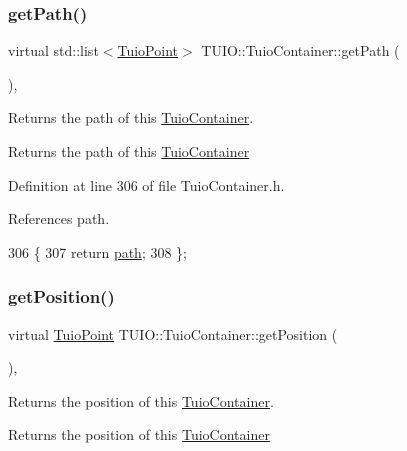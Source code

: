 \subsubsection{\texorpdfstring{get\+Path()}{getPath()}}
{\footnotesize\ttfamily virtual std\+::list$<$\hyperlink{class_t_u_i_o_1_1_tuio_point}{Tuio\+Point}$>$ T\+U\+I\+O\+::\+Tuio\+Container\+::get\+Path (\begin{DoxyParamCaption}{ }\end{DoxyParamCaption})\hspace{0.3cm}{\ttfamily [inline]}, {\ttfamily [virtual]}}

Returns the path of this \hyperlink{class_t_u_i_o_1_1_tuio_container}{Tuio\+Container}. \begin{DoxyReturn}{Returns}
the path of this \hyperlink{class_t_u_i_o_1_1_tuio_container}{Tuio\+Container} 
\end{DoxyReturn}


Definition at line 306 of file Tuio\+Container.\+h.



References path.


\begin{DoxyCode}
306                                              \{
307             \textcolor{keywordflow}{return} \hyperlink{class_t_u_i_o_1_1_tuio_container_a4bdb8935091e0736b6c19ce9fd676b9a}{path};
308         \};
\end{DoxyCode}
\mbox{\label{class_t_u_i_o_1_1_tuio_container_abbb93424274d67b2c30e757fd875af5f}} 
\subsubsection{\texorpdfstring{get\+Position()}{getPosition()}}
{\footnotesize\ttfamily virtual \hyperlink{class_t_u_i_o_1_1_tuio_point}{Tuio\+Point} T\+U\+I\+O\+::\+Tuio\+Container\+::get\+Position (\begin{DoxyParamCaption}{ }\end{DoxyParamCaption})\hspace{0.3cm}{\ttfamily [inline]}, {\ttfamily [virtual]}}

Returns the position of this \hyperlink{class_t_u_i_o_1_1_tuio_container}{Tuio\+Container}. \begin{DoxyReturn}{Returns}
the position of this \hyperlink{class_t_u_i_o_1_1_tuio_container}{Tuio\+Container} 
\end{DoxyReturn}


